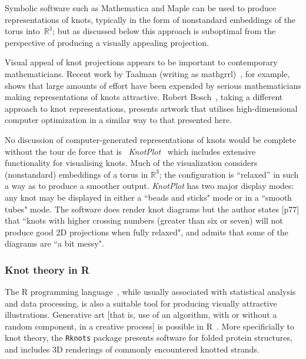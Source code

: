 \documentclass{birkjour}
\theoremstyle{definition}
\theoremstyle{remark}
\numberwithin{equation}{section}
\begin{document}
Symbolic software such as Mathematica and Maple can be used to produce
representations of knots, typically in the form of nonstandard
embeddings of the torus into~$\mathbb{R}^3$; but as discussed below
this approach is suboptimal from the perspective of producing a
visually appealing projection.

Visual appeal of knot projections appears to be important to
contemporary mathematicians.  Recent work by Taalman (writing as
mathgrrl)~\cite{taalman2019}, for example, shows that large amounts of
effort have been expended by serious mathematicians making
representations of knots attractive.  Robert Bosch~\cite{bosch2010},
taking a different approach to knot representations, presents artwork
that utilises high-dimensional computer optimization in a similar way
to that presented here.

No discussion of computer-generated representations of knots would be
complete without the tour de force that is~{\em
  KnotPlot}~\cite{scharein1997,scharein1998} which includes extensive
functionality for visualising knots.  Much of the visualization
considers (nonstandard) embeddings of a torus in $\mathbb{R}^3$; the
configuration is ``relaxed'' in such a way as to produce a smoother
output.  {\em KnotPlot} has two major display modes: any knot may be
displayed in either a ``beads and sticks" mode or in a ``smooth tubes"
mode.  The software does render knot diagrams but the author states
[p77] that ``knots with higher crossing numbers (greater than six or
seven) will not produce good 2D projections when fully relaxed", and
admits that some of the diagrams are ``a bit messy".


\subsubsection{Knot theory in R}

The R programming language~\cite{rcore2021}, while usually associated
with statistical analysis and data processing, is also a suitable tool
for producing visually attractive illustrations.  Generative art [that
  is, use of an algorithm, with or without a random component, in a
  creative process] is possible in R~\cite{brunner2021}.  More
specificially to knot theory, the {\tt Rknots}
package\cite{comoglio2011,comoglio2016} presents software for folded
protein structures, and includes 3D renderings of commonly encountered
knotted strands.
\end{document}
